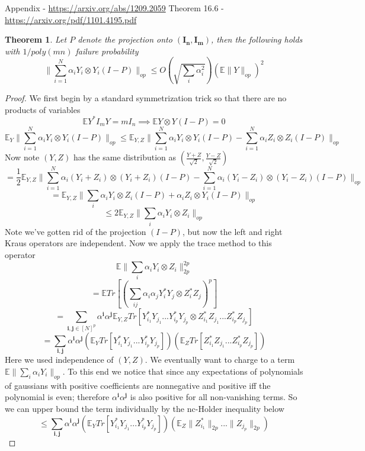 \documentclass{article}
\newtheorem{theorem}{Theorem}
\renewcommand{\vec}{\bm}
\newcommand{\E}{\mathbb{E}}
\begin{document}
 Appendix - \url{https://arxiv.org/abs/1209.2059}
 Theorem 16.6 - \url{https://arxiv.org/pdf/1101.4195.pdf}
\begin{theorem}
Let $P$ denote the projection onto $(\vec{I_{n}},\vec{I_{m}})$, then the following holds with $1/poly(mn)$ failure probability
\[ \|\sum_{i=1}^{N} \alpha_{i} Y_{i} \otimes Y_{i} (I - P) \|_{op} \leq O \left( \sqrt{\sum_{i} \alpha_{i}^{2}} \right) \left( \E \|Y\|_{op} \right)^{2} \]
\end{theorem}
\begin{proof}
We first begin by a standard symmetrization trick so that there are no products of variables
\[\E Y^{*} I_{m} Y = m I_{n} \implies \E Y \otimes Y (I-P) = 0\]
\[ \E_{Y} \|\sum_{i=1}^{N} \alpha_{i} Y_{i} \otimes Y_{i} (I - P)\|_{op} \leq \E_{Y,Z} \|\sum_{i=1}^{N} \alpha_{i} Y_{i} \otimes Y_{i} (I - P) - \sum_{i=1}^{N} \alpha_{i} Z_{i} \otimes Z_{i} (I - P) \|_{op}  \]
Now note $(Y,Z)$ has the same distribution as $(\frac{Y+Z}{\sqrt{2}},\frac{Y-Z}{\sqrt{2}})$
\[ = \frac{1}{2}\E_{Y,Z} \|\sum_{i=1}^{N} \alpha_{i} (Y_{i}+Z_{i}) \otimes (Y_{i}+Z_{i}) (I - P) - \sum_{i=1}^{N} \alpha_{i} (Y_{i}-Z_{i}) \otimes (Y_{i}-Z_{i}) (I - P) \|_{op}  \]
\[ = \E_{Y,Z} \|\sum_{i} \alpha_{i} Y_{i} \otimes Z_{i} (I-P) + \alpha_{i} Z_{i} \otimes Y_{i} (I-P)\|_{op}  \]
\[ \leq 2 \E_{Y,Z} \|\sum_{i} \alpha_{i} Y_{i} \otimes Z_{i}\|_{op}   \]
Note we've gotten rid of the projection $(I-P)$, but now the left and right Kraus operators are independent. Now we apply the trace method to this operator
\[ \E \|\sum_{i} \alpha_{i} Y_{i} \otimes Z_{i}\|_{2p}^{2p} \]
\[ = \E Tr [ \left( \sum_{ij} \alpha_{i} \alpha_{j} Y_{i}^{*} Y_{j} \otimes Z_{i}^{*} Z_{j} \right)^{p} ]  \]
\[ = \sum_{\vec{i},\vec{j} \in [N]^{p}} \alpha^{\vec{i}} \alpha^{\vec{j}} \E_{Y,Z} Tr [ Y_{i_{1}}^{*} Y_{j_{1}} ... Y_{i_{p}}^{*} Y_{j_{p}} \otimes Z_{i_{1}}^{*} Z_{j_{1}} ... Z_{i_{p}}^{*} Z_{j_{p}}  ]   \]
\[ = \sum_{\vec{i},\vec{j}} \alpha^{\vec{i}} \alpha^{\vec{j}} (\E_{Y} Tr [ Y_{i_{1}}^{*} Y_{j_{1}} ... Y_{i_{p}}^{*} Y_{j_{p}} ] ) (\E_{Z} Tr [ Z_{i_{1}}^{*} Z_{j_{1}} ... Z_{i_{p}}^{*} Z_{j_{p}} ] )  \]
Here we used independence of $(Y,Z)$. We eventually want to charge to a term $\E \|\sum_{i} \alpha_{i} Y_{i}\|_{op}$. To this end we notice that since any expectations of polynomials of gaussians with positive coefficients are nonnegative and positive iff the polynomial is even; therefore $\alpha^{\vec{i}} \alpha^{\vec{j}}$ is also positive for all non-vanishing terms. So we can upper bound the term individually by the nc-Holder inequality below
\[ \leq  \sum_{\vec{i},\vec{j}} \alpha^{\vec{i}} \alpha^{\vec{j}} (\E_{Y} Tr [ Y_{i_{1}}^{*} Y_{j_{1}} ... Y_{i_{p}}^{*} Y_{j_{p}} ] ) ( \E_{Z} \|Z_{i_{1}}^{*}\|_{2p} ... \|Z_{j_{p}}\|_{2p} )  \]


\end{proof}
\end{document}
